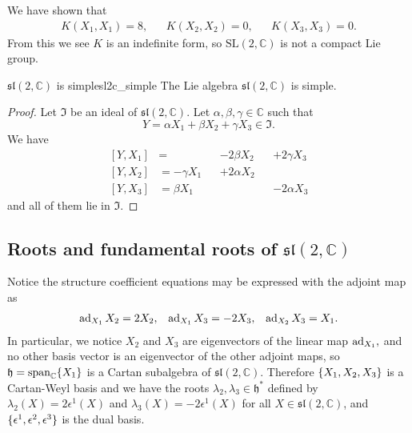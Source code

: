 We have shown that
\begin{equation*}
    \begin{aligned}
        K(X_1, X_1) = 8, && K(X_2, X_2) = 0, && K(X_3, X_3) = 0.
    \end{aligned}
\end{equation*}
From this we see \(K\) is an indefinite form, so \(\mathrm{SL}(2,\mathbb{C})\) is not a compact Lie group.

\begin{proposition}{\(\mathfrak{sl}(2,\mathbb{C})\) is simple}{sl2c_simple}
    The Lie algebra \(\mathfrak{sl}(2,\mathbb{C})\) is simple.
\end{proposition}
\begin{proof}
    Let \(\mathfrak{I}\) be an ideal of \(\mathfrak{sl}(2,\mathbb{C})\). Let \(\alpha, \beta, \gamma \in \mathbb{C}\) such that
    \begin{equation*}
        Y = \alpha X_1 + \beta X_2 + \gamma X_3 \in \mathfrak{I}.
    \end{equation*}
    We have
    \begin{equation*}
        \begin{aligned}
            [Y, X_1] &= &&-2 \beta X_2 &&+ 2 \gamma X_3\\
            [Y, X_2] &= -\gamma X_1 &&+ 2 \alpha X_2&&\\
            [Y, X_3] &= \beta X_1&&  &&- 2 \alpha X_3
        \end{aligned}
    \end{equation*}
    and all of them lie in \(\mathfrak{I}.\)
    \todo
\end{proof}

\subsection{Roots and fundamental roots of \texorpdfstring{\(\mathfrak{sl}(2,\mathbb{C})\)}{sl(2,C)}}

Notice the structure coefficient equations may be expressed with the adjoint map as
\begin{equation*}
    \begin{aligned}
        \operatorname{ad}_{X_1}X_2 = 2 X_2, && \operatorname{ad}_{X_1}X_3 = -2 X_3, && \operatorname{ad}_{X_2}X_3 = X_1.
    \end{aligned}
\end{equation*}
In particular, we notice \(X_2\) and \(X_3\) are eigenvectors of the linear map \(\operatorname{ad}_{X_1},\) and no other basis vector is an eigenvector of the other adjoint maps, so \(\mathfrak{h} = \mathrm{span}_{\mathbb{C}}\{X_1\}\) is a Cartan subalgebra of \(\mathfrak{sl}(2,\mathbb{C})\). Therefore \(\{X_1, X_2, X_3\}\) is a Cartan-Weyl basis and we have the roots \(\lambda_2, \lambda_3 \in \mathfrak{h}^{\ast}\) defined by \(\lambda_2(X) = 2 \epsilon^1(X)\) and \(\lambda_3(X) = -2 \epsilon^1(X)\) for all \(X \in \mathfrak{sl}(2,\mathbb{C})\), and \(\{\epsilon^1,\epsilon^2,\epsilon^3\}\) is the dual basis.

